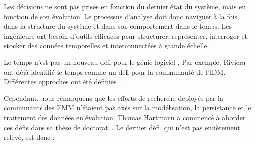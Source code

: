 %
Les décisions ne sont pas prises en fonction du dernier état du système, mais en fonction de son évolution.
Le processus d'analyse doit donc naviguer à la fois dans la structure du système et dans son comportement dans le temps.
Les ingénieurs ont besoin d'outils efficaces pour structurer, représenter, interroger et stocker des données temporelles et interconnectées à grande échelle.

Le temps n'est pas un nouveau défi pour le génie logiciel . 
Par exemple, Riviera~\etal \cite{DBLP:conf/models/RiveraRV08} ont déjà identifié le temps comme un défi pour la communauté de l'IDM. 
Différentes approches ont été définies~\cite{DBLP:conf/sle/BousseCCGB15, DBLP:conf/sle/KansoT12, DBLP:conf/icse/KoegelH10, DBLP:conf/seke/0001FNMKT14}.

Cependant, nous remarquons que les efforts de recherche déployés par la communauté des EMM n'étaient pas axés sur la modélisation, la persistance et le traitement des données en évolution. 
Thomas Hartmann a commencé à aborder ces défis dans sa thèse de doctorat~\cite{DBLP:phd/basesearch/Hartmann16}. 
Le dernier défi, qui n'est pas entièrement relevé, est donc :
\vspace{-2em}
